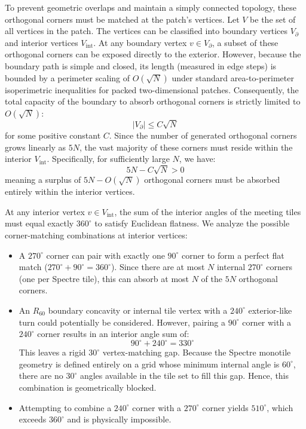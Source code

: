 \documentclass[11pt, a4paper]{amsart}
\begin{document}
To prevent geometric overlaps and maintain a simply connected topology, these orthogonal corners must be matched at the patch's vertices. Let $V$ be the set of all vertices in the patch. The vertices can be classified into boundary vertices $V_{\partial}$ and interior vertices $V_{\text{int}}$. 
At any boundary vertex $v \in V_{\partial}$, a subset of these orthogonal corners can be exposed directly to the exterior. However, because the boundary path is simple and closed, its length (measured in edge steps) is bounded by a perimeter scaling of $O(\sqrt{N})$ under standard area-to-perimeter isoperimetric inequalities for packed two-dimensional patches. Consequently, the total capacity of the boundary to absorb orthogonal corners is strictly limited to $O(\sqrt{N})$:
\begin{equation}
|V_{\partial}| \le C \sqrt{N}
\end{equation}
for some positive constant $C$. Since the number of generated orthogonal corners grows linearly as $5N$, the vast majority of these corners must reside within the interior $V_{\text{int}}$. Specifically, for sufficiently large $N$, we have:
\begin{equation}
5N - C\sqrt{N} > 0
\end{equation}
meaning a surplus of $5N - O(\sqrt{N})$ orthogonal corners must be absorbed entirely within the interior vertices.

At any interior vertex $v \in V_{\text{int}}$, the sum of the interior angles of the meeting tiles must equal exactly $360^\circ$ to satisfy Euclidean flatness. We analyze the possible corner-matching combinations at interior vertices:
\begin{itemize}
    \item A $270^\circ$ corner can pair with exactly one $90^\circ$ corner to form a perfect flat match ($270^\circ + 90^\circ = 360^\circ$). Since there are at most $N$ internal $270^\circ$ corners (one per Spectre tile), this can absorb at most $N$ of the $5N$ orthogonal corners.
    \item An $R_{60}$ boundary concavity or internal tile vertex with a $240^\circ$ exterior-like turn could potentially be considered. However, pairing a $90^\circ$ corner with a $240^\circ$ corner results in an interior angle sum of:
    \begin{equation}
    90^\circ + 240^\circ = 330^\circ
    \end{equation}
    This leaves a rigid $30^\circ$ vertex-matching gap. Because the Spectre monotile geometry is defined entirely on a grid whose minimum internal angle is $60^\circ$, there are no $30^\circ$ angles available in the tile set to fill this gap. Hence, this combination is geometrically blocked.
    \item Attempting to combine a $240^\circ$ corner with a $270^\circ$ corner yields $510^\circ$, which exceeds $360^\circ$ and is physically impossible.
\end{itemize}
\end{document}
